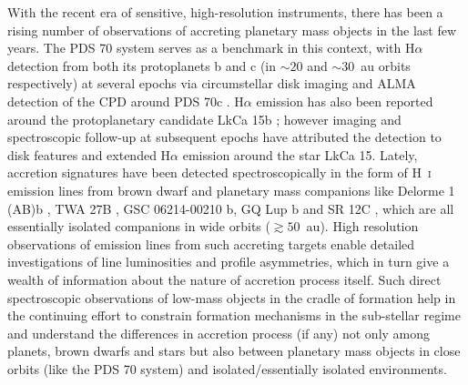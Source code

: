 \documentclass{aa}
\newcommand{\Hi}{H~\textsc{i}\xspace}
\begin{document}
With the recent era of sensitive, high-resolution instruments, there has been a rising number of observations of accreting planetary mass objects in the last few years. The PDS 70 system serves as a benchmark in this context, with H$\alpha$ detection from both its protoplanets b and c (in $\sim20$ and $\sim30$~au orbits respectively) at several epochs via circumstellar disk imaging \citep{wagner2018, haffert2019, hashimoto2020, zhou2021} and ALMA \citep{alma} detection of the CPD around PDS 70c \citep{isella2019, benistry2021}. H$\alpha$ emission has also been reported around the protoplanetary candidate LkCa 15b \citep{sallum2015}; however imaging and spectroscopic follow-up at subsequent epochs \citep{whelan2015, mendi2018, currie2019, blakely2022} have attributed the detection to disk features and extended H$\alpha$ emission around the star LkCa 15. %
Lately, accretion signatures have been detected spectroscopically in the form of \Hi emission lines from brown dwarf and planetary mass companions like Delorme 1 (AB)b \citep{erikson2020, betti2022, ringqvist2023}, TWA 27B \citep{luhman2023}, GSC 06214-00210 b, GQ Lup b \citep{demars2023} and SR 12C \citep{sr12c2018,sr12c2018erratum}, which are all essentially isolated companions in wide orbits ($\gtrsim50$~au). High resolution observations of emission lines from such accreting targets enable detailed investigations of line luminosities and profile asymmetries, which in turn give a wealth of information about the nature of accretion process itself. Such direct spectroscopic observations of low-mass objects in the cradle of formation help in the continuing effort to constrain formation mechanisms in the sub-stellar regime and understand the differences in accretion process (if any) not only among planets, brown dwarfs and stars but also between planetary mass objects in close orbits (like the PDS 70 system) and isolated/essentially isolated environments.
\end{document}
